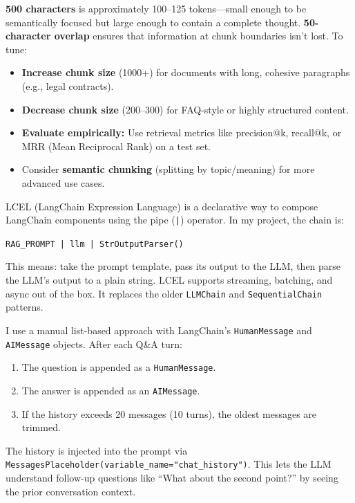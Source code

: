 \documentclass[12pt,a4paper]{article}
\begin{document}
\begin{interviewbox}
\end{interviewbox}
\begin{answerbox}
\textbf{500 characters} is approximately 100--125 tokens—small enough to be semantically focused but large enough to contain a complete thought. \textbf{50-character overlap} ensures that information at chunk boundaries isn't lost. To tune:
\begin{itemize}
  \item \textbf{Increase chunk size} (1000+) for documents with long, cohesive paragraphs (e.g., legal contracts).
  \item \textbf{Decrease chunk size} (200--300) for FAQ-style or highly structured content.
  \item \textbf{Evaluate empirically:} Use retrieval metrics like precision@k, recall@k, or MRR (Mean Reciprocal Rank) on a test set.
  \item Consider \textbf{semantic chunking} (splitting by topic/meaning) for more advanced use cases.
\end{itemize}
\end{answerbox}

\begin{interviewbox}
\end{interviewbox}
\begin{answerbox}
LCEL (LangChain Expression Language) is a declarative way to compose LangChain components using the pipe (\texttt{|}) operator. In my project, the chain is:

\texttt{RAG\_PROMPT | llm | StrOutputParser()}

This means: take the prompt template, pass its output to the LLM, then parse the LLM's output to a plain string. LCEL supports streaming, batching, and async out of the box. It replaces the older \texttt{LLMChain} and \texttt{SequentialChain} patterns.
\end{answerbox}

\begin{interviewbox}
\end{interviewbox}
\begin{answerbox}
I use a manual list-based approach with LangChain's \texttt{HumanMessage} and \texttt{AIMessage} objects. After each Q\&A turn:
\begin{enumerate}
  \item The question is appended as a \texttt{HumanMessage}.
  \item The answer is appended as an \texttt{AIMessage}.
  \item If the history exceeds 20 messages (10 turns), the oldest messages are trimmed.
\end{enumerate}
The history is injected into the prompt via \texttt{MessagesPlaceholder(variable\_name="chat\_history")}. This lets the LLM understand follow-up questions like ``What about the second point?'' by seeing the prior conversation context.
\end{answerbox}
\end{document}
